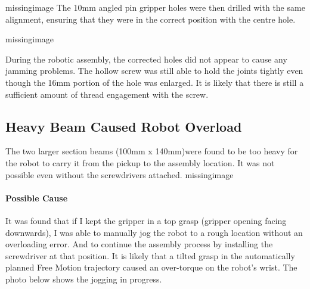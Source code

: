 missingimage
The 10mm angled pin gripper holes were then drilled with the same alignment, ensuring that they were in the correct position with the centre hole. 

missingimage

During the robotic assembly, the corrected holes did not appear to cause any jamming problems. The hollow screw was still able to hold the joints tightly even though the 16mm portion of the hole was enlarged. It is likely that there is still a sufficient amount of thread engagement with the screw.

\subsection{Heavy Beam Caused Robot Overload}
The two larger section beams (100mm x 140mm)were found to be too heavy for the robot to carry it from the pickup to the assembly location. It was not possible even without the screwdrivers attached.
missingimage

\paragraph{Possible Cause}
It was found that if I kept the gripper in a top grasp (gripper opening facing downwards), I was able to manually jog the robot to a rough location without an overloading error. And to continue the assembly process by installing the screwdriver at that position. It is likely that a tilted grasp in the automatically planned Free Motion trajectory caused an over-torque on the robot's wrist. The photo below shows the jogging in progress.

